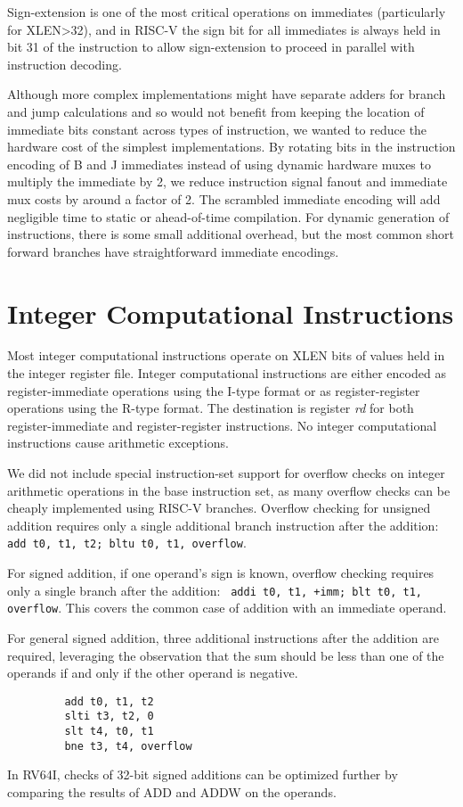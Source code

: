 \begin{commentary}
Sign-extension is one of the most critical operations on immediates
(particularly for XLEN>32), and in RISC-V the sign bit for all immediates
is always held in bit 31 of the instruction to allow sign-extension to
proceed in parallel with instruction decoding.

Although more complex implementations might have separate adders for
branch and jump calculations and so would not benefit from keeping the
location of immediate bits constant across types of instruction, we
wanted to reduce the hardware cost of the simplest implementations.
By rotating bits in the instruction encoding of B and J immediates
instead of using dynamic hardware muxes to multiply the immediate by
2, we reduce instruction signal fanout and immediate mux costs by
around a factor of 2.  The scrambled immediate encoding will add
negligible time to static or ahead-of-time compilation.  For dynamic
generation of instructions, there is some small additional
overhead, but the most common short forward branches have
straightforward immediate encodings.
\end{commentary}

\section{Integer Computational Instructions}

Most integer computational instructions operate on XLEN bits of values
held in the integer register file.  Integer computational instructions
are either encoded as register-immediate operations using the I-type
format or as register-register operations using the R-type format.
The destination is register {\em rd} for both register-immediate and
register-register instructions.  No integer computational instructions
cause arithmetic exceptions.

\begin{commentary}
We did not include special instruction-set support for overflow checks
on integer arithmetic operations in the base instruction set, as many
overflow checks can be cheaply implemented using RISC-V branches.
Overflow checking for unsigned addition requires only a single
additional branch instruction after the addition:
\verb! add t0, t1, t2; bltu t0, t1, overflow!.

For signed addition, if one operand's sign is known, overflow checking
requires only a single branch after the addition:
\verb! addi t0, t1, +imm; blt t0, t1, overflow!.  This covers the
common case of addition with an immediate operand.

For general signed addition, three additional instructions after the
addition are required, leveraging the observation that the sum should
be less than one of the operands if and only if the other operand is
negative.
\begin{verbatim}
         add t0, t1, t2
         slti t3, t2, 0
         slt t4, t0, t1
         bne t3, t4, overflow
\end{verbatim}
In RV64I, checks of 32-bit signed additions can be optimized further by
comparing the results of ADD and ADDW on the operands.
\end{commentary}

